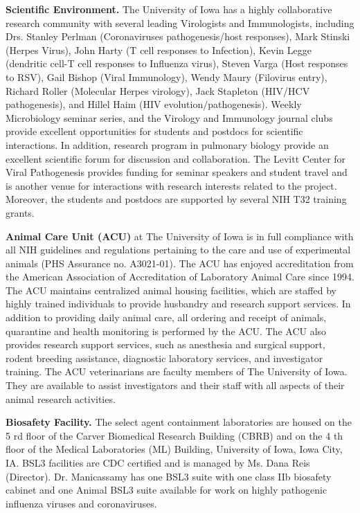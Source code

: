 \documentclass[onecolumn, compsoc,12pt]{IEEEtran}
\begin{document}
\textbf{Scientific Environment. } The University of Iowa has a highly collaborative research community with several leading Virologists and
Immunologists, including Drs. Stanley Perlman (Coronaviruses pathogenesis/host responses), Mark Stinski
(Herpes Virus), John Harty (T cell responses to Infection), Kevin Legge (dendritic cell-T cell responses to
Influenza virus), Steven Varga (Host responses to RSV), Gail Bishop (Viral Immunology), Wendy Maury
(Filovirus entry), Richard Roller (Molecular Herpes virology), Jack Stapleton (HIV/HCV pathogenesis), and
Hillel Haim (HIV evolution/pathogenesis). Weekly Microbiology seminar series, and the Virology and
Immunology journal clubs provide excellent opportunities for students and postdocs for scientific interactions.
In addition, research program in pulmonary biology provide an excellent scientific forum for discussion and
collaboration. The Levitt Center for Viral Pathogenesis provides funding for seminar speakers and student
travel and is another venue for interactions with research interests related to the project. Moreover, the
students and postdocs are supported by several NIH T32 training grants.


\textbf{Animal Care Unit (ACU)} at The University of Iowa is in full compliance with all NIH guidelines and regulations
pertaining to the care and use of experimental animals (PHS Assurance no. A3021-01). The ACU has enjoyed
accreditation from the American Association of Accreditation of Laboratory Animal Care since 1994. The ACU
maintains centralized animal housing facilities, which are staffed by highly trained individuals to provide
husbandry and research support services. In addition to providing daily animal care, all ordering and receipt of
animals, quarantine and health monitoring is performed by the ACU. The ACU also provides research support
services, such as anesthesia and surgical support, rodent breeding assistance, diagnostic laboratory services,
and investigator training. The ACU veterinarians are faculty members of The University of Iowa. They are
available to assist investigators and their staff with all aspects of their animal research activities.

\textbf{Biosafety Facility.} The select agent containment laboratories are housed on the 5 rd floor of the Carver Biomedical Research
Building (CBRB) and on the 4 th floor of the Medical Laboratories (ML) Building, University of Iowa, Iowa City,
IA. BSL3 facilities are CDC certified and is managed by Ms. Dana Reis (Director). Dr. Manicassamy has one
BSL3 suite with one class IIb biosafety cabinet and one Animal BSL3 suite available for work on highly pathogenic influenza viruses and coronaviruses.
\end{document}
